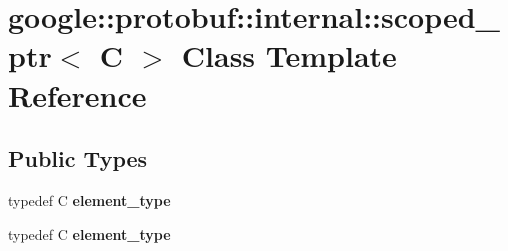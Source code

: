 \hypertarget{classgoogle_1_1protobuf_1_1internal_1_1scoped__ptr}{}\section{google\+:\+:protobuf\+:\+:internal\+:\+:scoped\+\_\+ptr$<$ C $>$ Class Template Reference}
\label{classgoogle_1_1protobuf_1_1internal_1_1scoped__ptr}
\subsection*{Public Types}
\begin{DoxyCompactItemize}
\item 
\mbox{\label{classgoogle_1_1protobuf_1_1internal_1_1scoped__ptr_ae62bfea056ebf3b2e2b6c9598fcccd23}} 
typedef C {\bfseries element\+\_\+type}
\item 
\mbox{\label{classgoogle_1_1protobuf_1_1internal_1_1scoped__ptr_ae62bfea056ebf3b2e2b6c9598fcccd23}} 
typedef C {\bfseries element\+\_\+type}
\end{DoxyCompactItemize}
